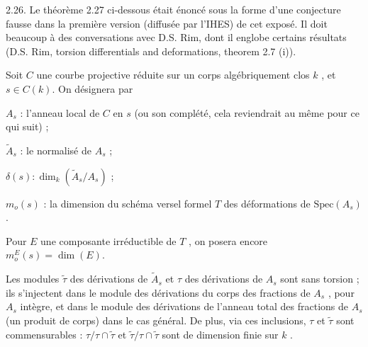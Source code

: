 2.26. Le théorème 2.27 ci-dessous était énoncé sous la forme d'une conjecture fausse dans la première version (diffusée par l'IHES) de cet exposé. Il doit beaucoup à des conversations avec D.S. Rim, dont il englobe certains résultats (D.S. Rim, torsion differentials and deformations, theorem 2.7 (i)).



Soit  $C$  une courbe projective réduite sur un corps algébriquement clos  $k$ , et  $s \in C(k)$. On désignera par

$A_{s}$ : l'anneau local de  $C$  en  $s$  (ou son complété, cela reviendrait au même pour ce qui suit) ;

$\widetilde{A}_{s}$ : le normalisé de  $A_{s}$ ;

$\delta(s):\dim_{k}(\widetilde{A}_{s}/A_{s})$  ;

$m_{o}(s)$ : la dimension du schéma versel formel  $T$  des déformations de $\mathrm{Spec}(A_{s})$.

Pour  $E$  une composante irréductible de  $T$ , on posera encore $m_{o}^{E}(s) = \dim(E)$.

Les modules  $\widetilde{\tau}$  des dérivations de  $\widetilde{A}_{s}$  et  $\tau$  des dérivations de  $A_{s}$  sont sans torsion ; ils s'injectent dans le module des dérivations du corps des fractions de  $A_{s}$ , pour  $A_s$  intègre, et dans le module des dérivations de l'anneau total des fractions de  $A_{s}$  (un produit de corps) dans le cas général. De plus, via ces inclusions,  $\tau$  et  $\widetilde{\tau}$  sont commensurables : $\tau/\tau\cap\widetilde{\tau}$  et  $\widetilde{\tau}/\tau\cap\widetilde{\tau}$  sont de dimension finie sur  $k$ .

